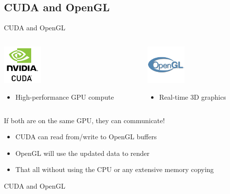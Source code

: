 \subsection{CUDA and OpenGL}\label{subsec:cuda-opengl}
\begin{frame}[t]{CUDA and OpenGL}
    \begin{columns}
        \begin{column}{0.5\textwidth}
            \centerline{\includegraphics[height=2cm]{./figures/cuda}}
            \begin{itemize}
                \item High-performance GPU compute
            \end{itemize}
        \end{column}
        \begin{column}{0.5\textwidth}
            \centerline{\includegraphics[height=2cm]{./figures/opengl}}
            \begin{itemize}
                \item Real-time 3D graphics
            \end{itemize}
        \end{column}
    \end{columns}
    \centerline{If both are on the same GPU, they can communicate!}
    \begin{itemize}
        \item CUDA can read from/write to OpenGL buffers
        \item OpenGL will use the updated data to render
        \item That all without using the CPU or any extensive memory copying
    \end{itemize}
\end{frame}

\begin{frame}{CUDA and OpenGL}
    \centerline{\resizebox{0.95\linewidth}{!}{}}
\end{frame}

